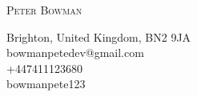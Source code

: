 \documentclass[10pt,A4]{article}
\newcommand{\metasection}[2]
    {
    \footnotesize{#2} \hspace*{\fill} \footnotesize{#1}\\[1pt]
    }
\begin{document}
    
    
    \pagestyle{fancy}	
    
    
    
    
    
    
    
    
    \vspace{-8pt}
    \begin{left}
    	\Huge \textsc{Peter Bowman}
    \end{left}
    
    
    
    \vspace{12pt}
    
    
    \metasection{}{ Brighton, United Kingdom, BN2 9JA}
    \metasection{}{ bowmanpetedev@gmail.com}
    \metasection{}{ +447411123680}
    \metasection{}{ bowmanpete123}
    \normalsize
    
    \vspace{32pt}
    
\end{document}
